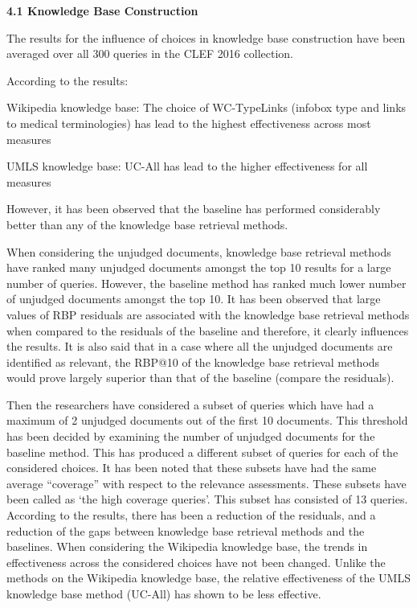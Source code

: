 \documentclass[]{article}
\begin{document}
\textbf{4.1 Knowledge Base Construction}

The results for the influence of choices in knowledge base construction have been averaged over all 300 queries in the CLEF 2016 collection.   

According to the results:

Wikipedia knowledge base: The choice of WC-TypeLinks (infobox type and links to medical terminologies) has lead to the highest effectiveness across most measures

UMLS knowledge base: UC-All has lead to the higher effectiveness for all measures 

However, it has been observed that the baseline has performed considerably better than any of the knowledge base retrieval methods.

When considering the unjudged documents, knowledge base retrieval methods have ranked many unjudged documents amongst the top 10 results for a large number of queries. However, the baseline method has ranked much lower number of unjudged documents amongst the top 10. It has been observed that large values of RBP residuals are associated with the knowledge base retrieval methods when compared to the residuals of the baseline and therefore, it clearly influences the results. It is also said that in a case where all the unjudged documents are identified as relevant, the RBP@10 of the knowledge base retrieval methods would prove largely superior than that of the baseline (compare the residuals).

Then the researchers have considered a subset of queries which have had a maximum of 2 unjudged documents out of the first 10 documents. This threshold has been decided by examining the number of unjudged documents for the baseline method. This has produced a different subset of queries for each of the considered choices. It has been noted that these subsets have had the same average “coverage” with respect to the relevance assessments. These subsets have been called as ‘the high coverage queries’. This subset has consisted of 13 queries.  According to the results, there has been a reduction of the residuals, and a reduction of the gaps between knowledge base retrieval methods and the baselines. When considering the Wikipedia knowledge base, the trends in effectiveness across the considered choices have not been changed. Unlike the methods on the Wikipedia knowledge base, the relative effectiveness of the UMLS knowledge base method (UC-All) has shown to be less effective.   
\end{document}
